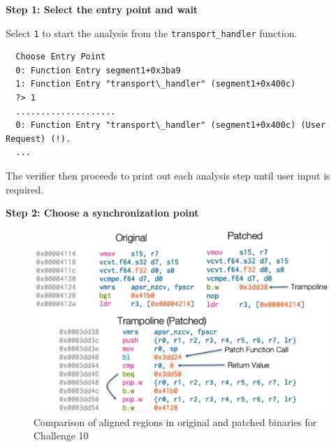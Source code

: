 \noindent\textbf{Step 1: Select the entry point and wait}

 Select \texttt{1} to start the analysis from the \texttt{transport\_handler} function.
\begin{verbatim}
  Choose Entry Point
  0: Function Entry segment1+0x3ba9
  1: Function Entry "transport\_handler" (segment1+0x400c)
  ?> 1
  ....................
  0: Function Entry "transport\_handler" (segment1+0x400c) (User Request) (!).
  ...
\end{verbatim}

 The verifier then proceeds to print out each analysis step until user input is required.

 \noindent\textbf{Step 2: Choose a synchronization point}

 \begin{figure}[ht]
  \centerline{\includegraphics[width=0.9\linewidth]{patch.pdf}}
  \caption{Comparison of aligned regions in original and patched
    binaries for Challenge 10}
\label{fig:aligned}
\end{figure}

